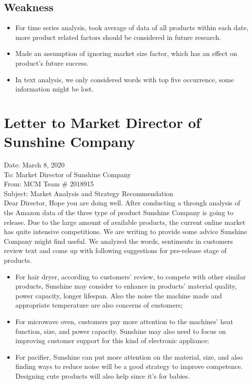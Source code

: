 \documentclass[12pt]{article}
\begin{document}
\subsection{Weakness}
\begin{itemize}
    \item For time series analysis, took average of data of all products within each date, more product related factors should be considered in future research.
    \item Made an assumption of ignoring market size factor, which has an effect on product's future success.
    \item In text analysis, we only considered words with top five occurrence, some information might be lost. 
\end{itemize}
\newpage
\section{Letter to Market Director of Sunshine Company}
Date: March 8, 2020\\[0.5ex]
To: Market Director of Sunshine Company\\[0.5ex]
From: MCM Team \# 2018915\\[0.5ex]
Subject: Market Analysis and Strategy Recommendation\\[1.5ex]
Dear Director,
\vskip 0.1in
Hope you are doing well. After conducting a through analysis of the Amazon data of the three type of product Sunshine Company is going to release. Due to the large amount of available products, the current online market has quite intensive competitions. We are writing to provide some advice Sunshine Company might find useful. 
\vskip 0.1in
We analyzed the words, sentiments in customers review text and come up with following suggestions for pre-release stage of products.
\begin{itemize}
    \item For hair dryer, according to customers' review, to compete with other similar products, Sunshine may consider to enhance in products' material quality, power capacity, longer lifespan. Also the noise the machine made and appropriate temperature are also concerns of customers;
    \item For microwave oven, customers pay more attention to the machines' heat function, size, and power capacity. Sunshine may also need to focus on improving customer support for this kind of electronic appliance; 
    \item For pacifier, Sunshine can put more attention on the material, size, and also finding ways to reduce noise will be a good strategy to improve competence. Designing cute products will also help since it's for babies. 
\end{itemize}
\end{document}
